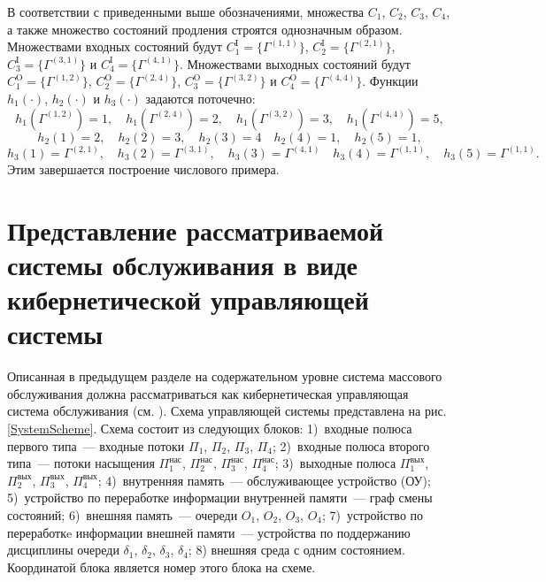 В соответствии с приведенными выше обозначениями,   множества $C_1$,  $C_2$,  $C_3$,  $C_4$,  а также множество состояний продления строятся однозначным образом. Множествами входных состояний будут $C_1^{\mathrm{I}}=\{\Gamma^{(1,  1)}\}$,  $C_2^{\mathrm{I}}=\{\Gamma^{(2,  1)}\}$,  $C_3^{\mathrm{I}}=\{\Gamma^{(3,  1)}\}$ и $C_4^{\mathrm{I}}=\{\Gamma^{(4,  1)}\}$. Множествами выходных состояний будут $C_1^{\mathrm{O}}=\{\Gamma^{(1,  2)}\}$,  $C_2^{\mathrm{O}}=\{\Gamma^{(2,  4)}\}$,  $C_3^{\mathrm{O}}=\{\Gamma^{(3,  2)}\}$ и $C_4^{\mathrm{O}}=\{\Gamma^{(4,  4)}\}$. Функции $h_1(\cdot)$,  $h_2(\cdot)$ и $h_3(\cdot)$ задаются поточечно:
\begin{equation*}
h_1(\Gamma^{(1,  2)})=1,  \quad h_1(\Gamma^{(2,  4)})=2,  \quad h_1(\Gamma^{(3,   2)})=3,  \quad h_1(\Gamma^{(4,  4)})=5, 
\end{equation*}
\begin{equation*}
h_2(1)=2,  \quad h_2(2)=3,  \quad h_2(3)=4 \quad h_2(4)=1,  \quad h_2(5)=1, 
\end{equation*}
\begin{equation*}
h_3(1)=\Gamma^{(2, 1)},  \quad h_3(2)=\Gamma^{(3, 1)},  \quad h_3(3)=\Gamma^{(4, 1)} \quad h_3(4)=\Gamma^{(1, 1)},  \quad h_3(5)=\Gamma^{(1, 1)}.
\end{equation*}
Этим завершается построение числового примера.

\section{Представление рассматриваемой системы обслуживания в виде кибернетической управляющей системы}
Описанная в предыдущем разделе на содержательном уровне система массового обслуживания должна рассматриваться как кибернетическая управляющая система обслуживания (см. \cite{Zorin:2011:2}). Схема управляющей системы представлена на рис. \ref{SystemScheme}. Схема состоит из следующих блоков: 1)~входные полюса первого типа~--- входные потоки $\Pi_1$,  $\Pi_2$,  $\Pi_3$,  $\Pi_4$; 2)~входные полюса второго типа~--- потоки насыщения $\Pi_1^{\mathrm{\text{нас}}}$,  $\Pi_2^{\mathrm{\text{нас}}}$,  $\Pi_3^{\mathrm{\text{нас}}}$,  $\Pi_4^{\mathrm{\text{нас}}}$; 3)~выходные полюса $\Pi_1^{\mathrm{\text{вых}}}$,  $\Pi_2^{\mathrm{\text{вых}}}$,  $\Pi_3^{\mathrm{\text{вых}}}$,  $\Pi_4^{\mathrm{\text{вых}}}$; 4)~внутренняя память~--- обслуживающее устройство (ОУ);  5)~устройство по переработке информации внутренней памяти~--- граф смены состояний;  6)~внешняя память~--- очереди $O_1$,  $O_2$,  $O_3$,  $O_4$; 7)~устройство по переработкe информации внешней памяти~--- устройства по поддержанию дисциплины очереди $\delta_1$,  $\delta_2$,  $\delta_3$,  $\delta_4$; 8) внешняя среда с одним состоянием. Координатой блока является номер этого блока на схеме.

